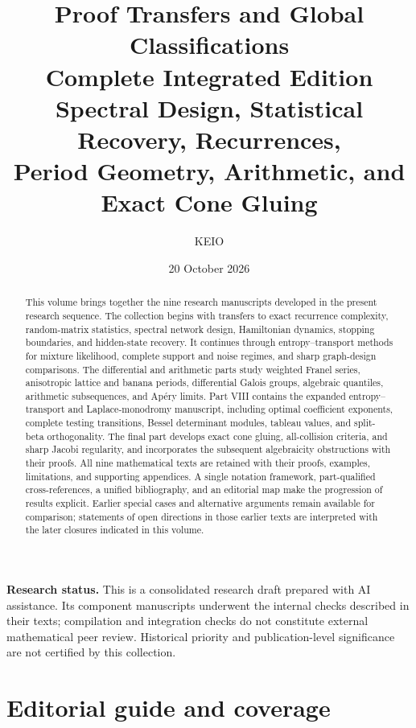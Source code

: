 \documentclass[11pt,a4paper]{article}
\theoremstyle{definition}
\theoremstyle{remark}
\numberwithin{equation}{section}
\begin{document}
\title{Proof Transfers and Global Classifications\\[6pt]
\large Complete Integrated Edition\\
Spectral Design, Statistical Recovery, Recurrences,\\
Period Geometry, Arithmetic, and Exact Cone Gluing}
\author{KEIO}
\date{20 October 2026}
\maketitle
\begin{abstract}
This volume brings together the nine research manuscripts developed in
the present research sequence. The collection begins with transfers to
exact recurrence complexity, random-matrix statistics, spectral network
design, Hamiltonian dynamics, stopping boundaries, and hidden-state
recovery. It continues through entropy--transport methods for mixture
likelihood, complete support and noise regimes, and sharp graph-design
comparisons. The differential and arithmetic parts study weighted Franel
series, anisotropic lattice and banana periods, differential Galois groups,
algebraic quantiles, arithmetic subsequences, and Ap\'ery limits.
Part VIII contains the expanded entropy--transport and
Laplace-monodromy manuscript, including optimal coefficient exponents,
complete testing transitions, Bessel determinant modules, tableau values,
and split-beta orthogonality. The final part develops exact cone gluing,
all-collision criteria, and sharp Jacobi regularity, and incorporates the
subsequent algebraicity obstructions with their proofs.
All nine mathematical texts are retained with their proofs, examples,
limitations, and supporting appendices. A single notation framework,
part-qualified cross-references, a unified bibliography, and an editorial
map make the progression of results explicit. Earlier special cases and
alternative arguments remain available for comparison; statements of
open directions in those earlier texts are interpreted with the later
closures indicated in this volume.
\end{abstract}

\noindent\textbf{Research status.} This is a consolidated research draft
prepared with AI assistance. Its component manuscripts underwent the
internal checks described in their texts; compilation and integration
checks do not constitute external mathematical peer review. Historical
priority and publication-level significance are not certified by this
collection.
\clearpage
\section*{Editorial guide and coverage}
\end{document}
